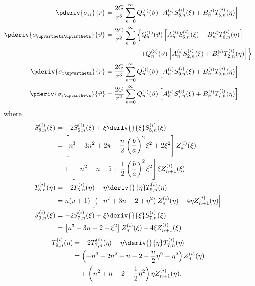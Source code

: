 \begin{align*}
	\pderiv{\sigma_{\mathrm{r}\mathrm{r}}}{r} &= \frac{2G}{r^3}\sum_{n=0}^\infty Q_n^{(0)}(\vartheta)\left[A_n^{(i)} S_{8,n}^{(i)}(\xi) + B_n^{(i)} T_{8,n}^{(i)}(\eta)\right]\\
	\pderiv{\sigma_{\upvartheta\upvartheta}}{\vartheta} &= \frac{2G}{r^2}\sum_{n=0}^\infty\left\{Q_n^{(1)}(\vartheta)\left[A_n^{(i)} S_{6,n}^{(i)}(\xi) + B_n^{(i)} T_{6,n}^{(i)}(\eta)\right] \right.\\ 
	&{\hskip5em\relax}\left. +  Q_n^{(3)}(\vartheta)\left[A_n^{(i)} S_{2,n}^{(i)}(\xi) + B_n^{(i)} T_{2,n}^{(i)}(\eta)\right]\right\}\\
	\pderiv{\sigma_{\mathrm{r}\upvartheta}}{r} &= \frac{2G}{r^3}\sum_{n=0}^\infty Q_n^{(1)}(\vartheta)\left[A_n^{(i)} S_{9,n}^{(i)}(\xi) + B_n^{(i)} T_{9,n}^{(i)}(\eta)\right]\\
	\pderiv{\sigma_{\mathrm{r}\upvartheta}}{\vartheta} &= \frac{2G}{r^2}\sum_{n=0}^\infty Q_n^{(2)}(\vartheta)\left[A_n^{(i)} S_{7,n}^{(i)}(\xi) + B_n^{(i)} T_{7,n}^{(i)}(\eta)\right]
\end{align*}
where
\begin{align*}
	S_{8,n}^{(i)}(\xi) &= -2S_{5,n}^{(i)}(\xi) + \xi \deriv{}{\xi}S_{5,n}^{(i)}(\xi) \\
	&= \left[n^3-3n^2+2n-\frac{n}{2}\left(\frac{b}{a}\right)^2\xi^2 + 2\xi^2\right]Z_n^{(i)}(\xi)\\ 
	&{\hskip1em\relax} + \left[-n^2-n-6+\frac{1}{2}\left(\frac{b}{a}\right)^2\xi^2\right]\xi Z_{n+1}^{(i)}(\xi)\\
	T_{8,n}^{(i)}(\eta) &= -2T_{5,n}^{(i)}(\eta) + \eta \deriv{}{\eta}T_{5,n}^{(i)}(\eta) \\
	&= n(n+1)\left[\left(-n^2+3n-2+\eta^2\right)Z_n^{(i)}(\eta) - 4\eta Z_{n+1}^{(i)}(\eta)\right]\\
	S_{9,n}^{(i)}(\xi) &= -2S_{7,n}^{(i)}(\xi) + \xi \deriv{}{\xi}S_{7,n}^{(i)}(\xi) \\
	&= \left[n^2-3n+2-\xi^2\right]Z_n^{(i)}(\xi) + 4\xi Z_{n+1}^{(i)}(\xi) \\
\end{align*}
\begin{align*}
	T_{9,n}^{(i)}(\eta) &= -2T_{7,n}^{(i)}(\eta) + \eta \deriv{}{\eta}T_{7,n}^{(i)}(\eta) \\
	&= \left(-n^3+2n^2+n-2+\frac{n}{2}\eta^2-\eta^2\right)Z_n^{(i)}(\eta)\\ 
	&{\hskip1em\relax} +\left(n^2+n+2-\frac{1}{2}\eta^2\right)\eta Z_{n+1}^{(i)}(\eta).
\end{align*}
